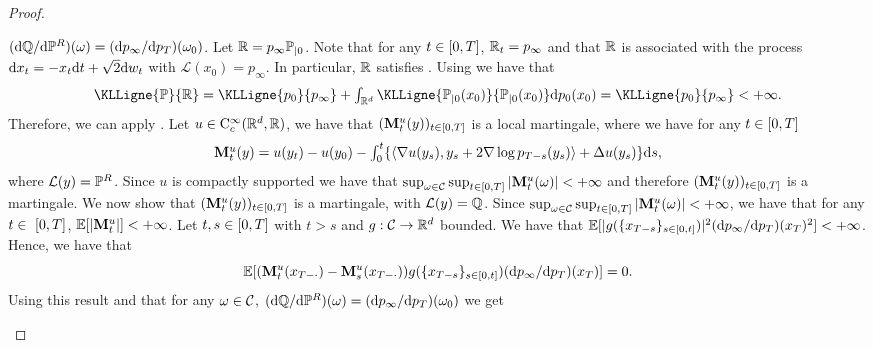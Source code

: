 \begin{proof}
\begin{enumerate}[wide, labelwidth=!, labelindent=0pt, label=(\alph*)]
      $(\mathrm{d} \mathbb{Q} / \mathrm{d} \mathbb{P}^R)(\omega) = (\mathrm{d} p_\infty / \mathrm{d}
      p_T)(\omega_0)$.  Let
      $\mathbb{R} = p_\infty \mathbb{P}_{|0}$. Note that for any $t \in \left[0,T\right]$,
      $\mathbb{R}_t = p_\infty$ and that $\mathbb{R}$ is associated with the process
      $\mathrm{d} x_t = -x_t \mathrm{d} t + \sqrt{2} \mathrm{d} w_t$ with
      $\mathcal{L}(x_0) = p_\infty$. In particular, $\mathbb{R}$ satisfies
      \cite[Hypothesis 1.8]{cattiaux2021time}. Using \cite[Theorem
      2.4]{leonard2014some} we have that
      \begin{equation}
        \textstyle{\KLLigne{\Pbb}{\Rbb} = \KLLigne{p_0}{p_\infty} + \int_{\rset^d} \KLLigne{\Pbb_{|0}(x_0)}{\Pbb_{|0}(x_0)} \rmd p_0(x_0) = \KLLigne{p_0}{p_\infty} < +\infty.}
      \end{equation}
      Therefore, we can apply \cite[Theorem 4.9]{cattiaux2021time}. Let
      $u \in \mathrm{C}^\infty_c(\mathbb{R}^d, \mathbb{R})$, we have that 
      $(\mathbf{M}_t^u(y))_{t \in \left[0,T\right]}$ is a local martingale, where we
      have for any $t \in \left[0,T\right]$
      \begin{equation}
        \textstyle{\mathbf{M}_t^u(y) = u(y_t) - u(y_0) - \int_0^t \{ \langle \nabla u(y_s), y_s + 2\nabla \log p_{T-s}(y_s) \rangle + \Delta u(y_s) \}\mathrm{d}s ,}
      \end{equation}
      where $\mathcal{L}(y) = \mathbb{P}^R$.  Since $u$ is compactly supported we
      have that
      $\sup_{\omega \in \mathcal{C}} \sup_{t \in \left[0,T\right]}
      \vert \mathbf{M}_t^u(\omega) \vert < +\infty$ and therefore
      $(\mathbf{M}_t^u(y))_{t \in \left[0,T\right]}$ is a martingale. We now show that
      $(\mathbf{M}_t^u(y))_{t \in \left[0,T\right]}$ is a martingale, with
      $\mathcal{L}(y) = \mathbb{Q}$. Since
      $\sup_{\omega \in \mathcal{C}} \sup_{t \in \left[0,T\right]}
      \vert \mathbf{M}_t^u(\omega) \vert < +\infty$, we have that for any
      $t \in \ \left[0,T\right]$, $\mathbb{E} [ \vert \mathbf{M}_t^u \vert ]<+\infty$. Let
      $t,s \in \left[0,T\right]$ with $t > s$ and $g : \mathcal{C} \to \mathbb{R}^d$
      bounded.  We have that
      $\mathbb{E} [ \vert g(\{x_{T-s}\}_{s \in \left[0,t\right]}) \vert^2(\mathrm{d} p_\infty / \mathrm{d}
        p_T)(x_T)^2 ] < +\infty$. Hence, we have that
      \begin{equation}
        \mathbb{E} [ (\mathbf{M}_t^u(x_{T-\cdot}) - \mathbf{M}_s^u(x_{T-\cdot})) g(\{x_{T-s}\}_{s \in \left[0,t\right]})(\mathrm{d} p_\infty / \mathrm{d}
        p_T)(x_T) ] = 0 .
      \end{equation}
      Using this result and that for any $\omega \in \mathcal{C}$,
      $(\mathrm{d} \mathbb{Q} / \mathrm{d} \mathbb{P}^R)(\omega) = (\mathrm{d} p_\infty / \mathrm{d}
      p_T)(\omega_0)$ we get
      \begin{equation}

\end{equation}
\end{enumerate}
\end{proof}
